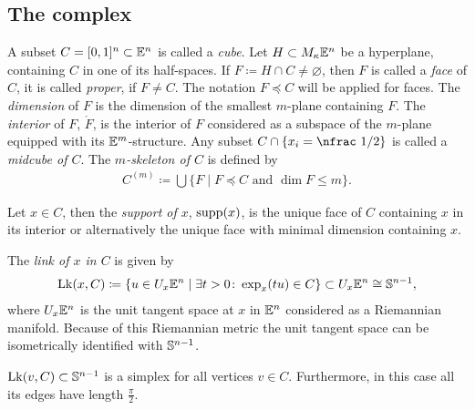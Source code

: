 \subsection{The complex}
\label{sec:complex}
\begin{defin}[Cubes]
  A subset \(C = [0,1]^n \subset \mathbb{E}^n\) is called a \emph{cube}. Let \(H \subset M_\kappa\mathbb{E}^n\)  be a hyperplane, containing \(C\) in one of its half-spaces. If \(F \coloneqq H \cap C \neq \varnothing\), then \(F\) is called a \emph{face} of \(C\), it is called \emph{proper}, if \(F \neq C\). The notation \(F \preceq C\) will be applied for faces. The \emph{dimension} of \(F\) is the dimension of the smallest \(m\)-plane containing \(F\). The \emph{interior} of \(F\), \(\mathring F\), is the interior of \(F\) considered as a subspace of the \(m\)-plane equipped with its \(\mathbb{E}^m\)-structure. Any subset \(C \cap \{x_i = \text{\nfrac 1/2}\}\) is called a \emph{midcube of \(C\)}. The \emph{\(m\)-skeleton of \(C\)} is defined by
  \begin{align*}
    C^{(m)} \coloneqq \bigcup \{F \mid F \preceq C \text{ and } \dim F \leq m\}.
  \end{align*}

  Let \(x \in C\), then the \emph{support of \(x\)}, \(\operatorname{supp}(x)\), is the unique face of \(C\) containing \(x\) in its interior or alternatively the unique face with minimal dimension containing \(x\).

  The \emph{link of \(x\) in \(C\)} is given by
  \begin{align*}
    \operatorname{Lk}(x,C) \coloneqq \{u \in U_x\mathbb{E}^n \mid \exists t > 0 \colon \exp_x(tu) \in C\} \subset U_x\mathbb{E}^n \cong \mathbb{S}^{n-1},
  \end{align*}
  where \(U_x\mathbb{E}^n\) is the unit tangent space at \(x\) in \(\mathbb{E}^n\) considered as a Riemannian manifold. Because of this Riemannian metric the unit tangent space can be isometrically identified with \(\mathbb{S}^{n-1}\).
\end{defin}

\begin{rem}
  \(\operatorname{Lk}(v,C) \subset \mathbb{S}^{n-1}\) is a simplex for all vertices \(v \in C\). Furthermore, in this case all its edges have length \(\frac{\pi}{2}\).
\end{rem}

